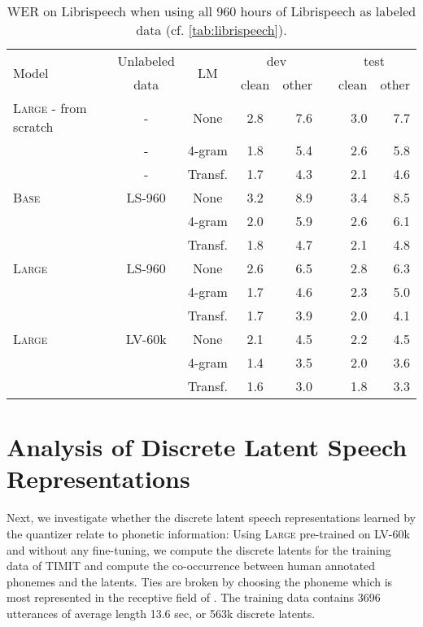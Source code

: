 \documentclass{article}
\newcommand{\wvppbase}{\textsc{Base}}
\newcommand{\wvppbig}{\textsc{Large}}
\newcommand{\libri}{Librispeech}
\newcommand{\voxsz}{LV-60k}
\newcommand{\librisz}{LS-960}
\begin{document}
\begin{table}[h!]
\caption{WER on \libri{} when using all 960 hours of \libri{} as labeled data (cf. \autoref{tab:librispeech}).
}
\label{tab:librispeech_full}
\centering 
\begin{tabular}{lcccrrrr}
\toprule
\multirow{2}{*}{Model} & Unlabeled & \multirow{2}{*}{LM} & \multicolumn{2}{c}{dev} && \multicolumn{2}{c}{test} \\
\cline{4-5}\cline{7-8} 
{} & data & {} & clean & other && clean & other \\
\midrule
\wvppbig{} - from scratch & - & None & 2.8 & 7.6 && 3.0 & 7.7 \\
& - & 4-gram & 1.8 & 5.4 && 2.6 & 5.8 \\
& - & Transf. & 1.7 & 4.3 && 2.1 & 4.6 \\
\midrule
\wvppbase{} & \librisz{} & None & 3.2 & 8.9 && 3.4 & 8.5 \\
&& 4-gram & 2.0 & 5.9 && 2.6 & 6.1 \\
&& Transf. & 1.8 & 4.7 && 2.1 & 4.8 \\
\wvppbig{} & \librisz{} & None & 2.6 & 6.5 && 2.8 & 6.3 \\
&& 4-gram & 1.7 & 4.6 && 2.3 & 5.0 \\
&& Transf. & 1.7 & 3.9 && 2.0 & 4.1 \\
\wvppbig{} & \voxsz{} & None & 2.1 & 4.5 && 2.2 & 4.5 \\
&& 4-gram & 1.4 & 3.5 && 2.0 & 3.6 \\
&& Transf. & 1.6 & 3.0 && 1.8 & 3.3 \\
\bottomrule
\end{tabular}
\end{table}

\newpage 
\section{Analysis of Discrete Latent Speech Representations}
\label{app:analysis_latents}

Next, we investigate whether the discrete latent speech representations  learned by the quantizer relate to phonetic information:
Using \wvppbig{} pre-trained on \voxsz{} and without any fine-tuning, we compute the discrete latents for the training data of TIMIT and compute the co-occurrence between human annotated phonemes and the latents.
Ties are broken by choosing the phoneme which is most represented in the receptive field of .
The training data contains 3696 utterances of average length 13.6 sec, or 563k discrete latents.
\end{document}
